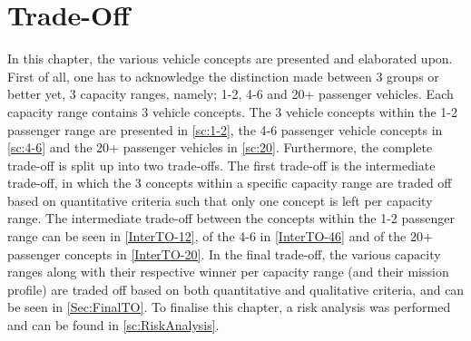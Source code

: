 \newpage
\chapter{Trade-Off}
\label{ch-tradeoff}


In this chapter, the various vehicle concepts are presented and elaborated upon. First of all, one has to acknowledge the distinction made between 3 groups or better yet, 3 capacity ranges, namely; 1-2, 4-6 and 20+ passenger vehicles. Each capacity range contains 3 vehicle concepts. The 3 vehicle concepts within the 1-2 passenger range are presented in \autoref{sc:1-2}, the 4-6 passenger vehicle concepts in \autoref{sc:4-6} and the 20+ passenger vehicles in \autoref{sc:20}. Furthermore, the complete trade-off is split up into two trade-offs. The first trade-off is the intermediate trade-off, in which the 3 concepts within a specific capacity range are traded off based on quantitative criteria such that only one concept is left per capacity range. The intermediate trade-off between the concepts within the 1-2 passenger range can be seen in \autoref{InterTO-12}, of the 4-6 in \autoref{InterTO-46} and of the 20+ passenger concepts in \autoref{InterTO-20}. In the final trade-off, the various capacity ranges along with their respective winner per capacity range (and their mission profile) are traded off based on both quantitative and qualitative criteria, and can be seen in \autoref{Sec:FinalTO}. To finalise this chapter, a risk analysis was performed and can be found in \autoref{sc:RiskAnalysis}.   




